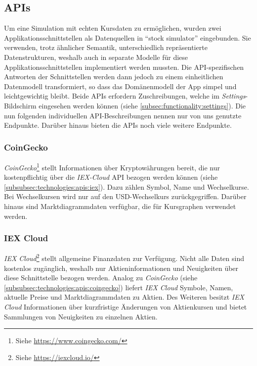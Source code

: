 \documentclass[a4paper]{article}
\begin{document}
\subsection{APIs}
\label{subsec:technologies:apis}
Um eine Simulation mit echten Kursdaten zu ermöglichen, wurden zwei Applikationsschnittstellen als Datenquellen in "`stock simulator"' eingebunden.
Sie verwenden, trotz ähnlicher Semantik, unterschiedlich repräsentierte Datenstrukturen, weshalb auch in separate Modelle für diese Applikationsschnittstellen implementiert werden mussten.
Die API-spezifischen Antworten der Schnittstellen werden dann jedoch zu einem einheitlichen Datenmodell transformiert, so dass das Domänenmodell der App simpel und leichtgewichtig bleibt.
Beide APIs erfordern Zuschreibungen, welche im \textit{Settings}-Bildschirm eingesehen werden können (siehe \autoref{subsec:functionality:settings}).
Die nun folgenden individuellen API-Beschreibungen nennen nur von uns genutzte Endpunkte.
Darüber hinaus bieten die APIs noch viele weitere Endpunkte.


\subsubsection{CoinGecko}
\label{subsubsec:technologies:apis:coingecko}
\textit{CoinGecko}\footnote{Siehe \url{https://www.coingecko.com/}} stellt Informationen über Kryptowährungen bereit, die nur kostenpflichtig über die \textit{IEX-Cloud} API bezogen werden können (siehe \autoref{subsubsec:technologies:apis:iex}).
Dazu zählen Symbol, Name und Wechselkurse.
Bei Wechselkursen wird nur auf den USD-Wechselkurs zurückgegriffen.
Darüber hinaus sind Marktdiagrammdaten verfügbar, die für Kursgraphen verwendet werden.


\subsubsection{IEX Cloud}
\label{subsubsec:technologies:apis:iex}
\textit{IEX Cloud}\footnote{Siehe \url{https://iexcloud.io/}} stellt allgemeine Finanzdaten zur Verfügung.
Nicht alle Daten sind kostenlos zugänglich, weshalb nur Aktieninformationen und Neuigkeiten über diese Schnittstelle bezogen werden.
Analog zu \textit{CoinGecko} (siehe \autoref{subsubsec:technologies:apis:coingecko}) liefert \textit{IEX Cloud} Symbole, Namen, aktuelle Preise und Marktdiagrammdaten zu Aktien.
Des Weiteren besitzt \textit{IEX Cloud} Informationen über kurzfristige Änderungen von Aktienkursen und bietet Sammlungen von Neuigkeiten zu einzelnen Aktien.
\end{document}
